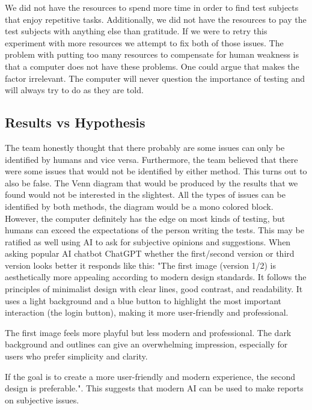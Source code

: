 \documentclass[journal,twocolumn]{IEEEtran}
\begin{document}
We did not have the resources to spend more time in order to find test subjects that enjoy repetitive tasks. Additionally, we did not have the resources to pay the test subjects with anything else than gratitude. If we were to retry this experiment with more resources we attempt to fix both of those issues. The problem with putting too many resources to compensate for human weakness is that a computer does not have these problems. One could argue that makes the factor irrelevant. The computer will never question the importance of testing and will always try to do as they are told.


\subsection{Results vs Hypothesis}
The team honestly thought that there probably are some issues can only be
identified by humans and vice versa. Furthermore, the team believed that there were some issues that would not be identified by either method. This turns out to also be false. The Venn diagram that would be produced by the results that we found would not be interested in the slightest. All the types of issues can be identified by both methods, the diagram would be a mono colored block.   However, the computer definitely has the edge on most kinds of testing, but humans can exceed the expectations of the person writing the tests. This may be ratified as well using AI to ask for subjective opinions and suggestions. When asking popular AI chatbot ChatGPT whether the first/second version or third version looks better it responds like this: "The first image (version 1/2) is aesthetically more appealing according to modern design standards. It follows the principles of minimalist design with clear lines, good contrast, and readability. It uses a light background and a blue button to highlight the most important interaction (the login button), making it more user-friendly and professional.

The first image feels more playful but less modern and professional. The dark background and outlines can give an overwhelming impression, especially for users who prefer simplicity and clarity.

If the goal is to create a more user-friendly and modern experience, the second design is preferable.". This suggests that modern AI can be used to make reports on subjective issues.
\end{document}
